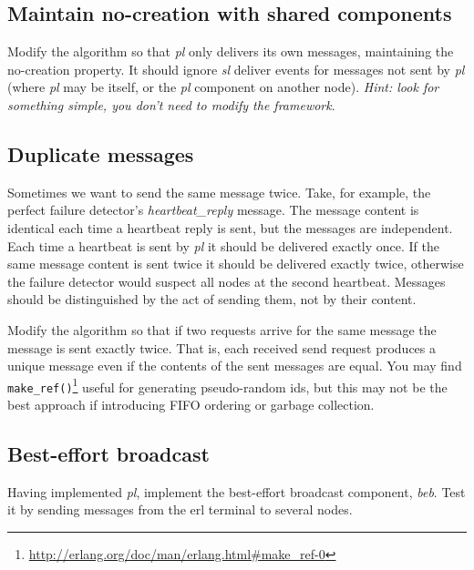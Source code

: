 \documentclass[a4paper]{article}
\begin{document}
\subsection{Maintain no-creation with shared components} %
\label{ssub:no_creation_with_multiple_stack_algorithms}

Modify the algorithm so that \emph{pl} only delivers its own messages, maintaining
the no-creation property. It should ignore \emph{sl} deliver events for messages not
sent by \emph{pl} (where \emph{pl} may be itself, or the \emph{pl} component
on another node). \emph{Hint: look for something simple, you don't need to
modify the framework}.


\subsection{Duplicate messages} %
\label{ssub:duplicate_messages}

Sometimes we want to send the same message twice. Take, for example, the
perfect failure detector's \emph{heartbeat\_reply} message. The message
content is identical each time a heartbeat reply is sent, but the messages are
independent. Each time a heartbeat is sent by \emph{pl} it should be delivered
exactly once. If the same message content is sent twice it should be
delivered exactly twice, otherwise the failure detector would suspect all nodes at
the second heartbeat. Messages should be distinguished by the act of sending
them, not by their content.

Modify the algorithm so that if two requests arrive for the same message
the message is sent exactly twice. That is, each received send request
produces a unique message even if the contents of the sent messages are equal.
You may find
\verb!make_ref()!\footnote{\url{http://erlang.org/doc/man/erlang.html\#make_ref-0}}
useful for generating pseudo-random ids, but this may not be the best approach
if introducing FIFO ordering or garbage collection.



\subsection{Best-effort broadcast} %
\label{sub:best_effort_broadcast}

Having implemented \emph{pl}, implement the best-effort broadcast component,
\emph{beb}. Test it by sending messages from the erl terminal to several
nodes.
\end{document}
